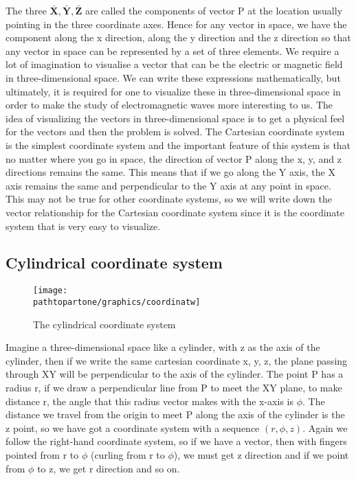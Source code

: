 The three  $\mathbf{\bar{X}, \bar{Y}, \bar{Z}}$ are called the components of vector P at the location usually pointing in the three coordinate axes. Hence for any vector in space, we have the component along the x direction, along the y direction and the z direction so that any vector in space can be represented by a set of three elements. We require a lot of imagination to visualise a vector that can be the electric or magnetic field in three-dimensional space. We can write these expressions mathematically, but ultimately, it is required for one to visualize these in three-dimensional space in order to make the study of electromagnetic waves more interesting to us. The idea of visualizing the vectors in three-dimensional space is to get a physical feel for the vectors and then the problem is solved. The Cartesian coordinate system is the simplest coordinate system and the important feature of this system is that no matter where you go in space, the direction of vector P along the x, y, and z directions remains the same. This means that if we go along the Y axis, the X axis remains the same and perpendicular to the Y axis at any point in space. This may not be true for other coordinate systems, so we will write down the vector relationship for the Cartesian coordinate system since it is the coordinate system that is very easy to visualize. 

\subsection{Cylindrical coordinate system}    
\begin{figure}[h]
\centering
\texttt{[image: \\pathtopartone/graphics/coordinatw]}
\caption{The cylindrical coordinate system}
\end{figure} 

Imagine a three-dimensional space like a cylinder, with z as the axis of the cylinder, then if we write the same cartesian coordinate x, y, z, the plane passing through XY will be perpendicular to the axis of the cylinder. The point P has a radius r, if we draw a perpendicular line from P to meet the XY plane, to make distance r, the angle that this radius vector makes with the x-axis is $\phi$. The distance we travel from the origin to meet P along the axis of the cylinder is the z point, so we have got a coordinate system with a sequence $( r, \phi, z)$. Again we follow the right-hand coordinate system, so if we have a vector, then with fingers pointed from r to $\phi $ (curling from r to $\phi$), we must get z direction and if we point from $\phi$ to z, we get r direction and so on.

